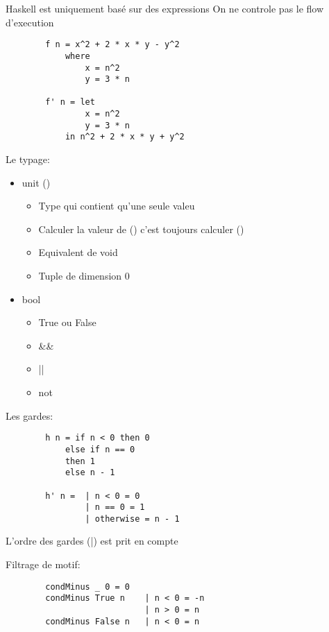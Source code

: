 \documentclass{article}
\begin{document}
    Haskell est uniquement basé sur des expressions
    On ne controle pas le flow d'execution

    \begin{lstlisting}
        f n = x^2 + 2 * x * y - y^2
            where
                x = n^2
                y = 3 * n

        f' n = let
                x = n^2
                y = 3 * n
            in n^2 + 2 * x * y + y^2
    \end{lstlisting}

    Le typage:
        \begin{itemize}
            \item unit ()
                \begin{itemize}
                    \item Type qui contient qu'une seule valeu
                    \item Calculer la valeur de () c'est toujours calculer ()
                    \item Equivalent de void
                    \item Tuple de dimension 0
                \end{itemize}
            \item bool
                \begin{itemize}
                    \item True ou False
                    \item &&
                    \item ||
                    \item not
                \end{itemize}

        \end{itemize}

    Les gardes:
    \begin{lstlisting}
        h n = if n < 0 then 0
            else if n == 0
            then 1
            else n - 1

        h' n =  | n < 0 = 0
                | n == 0 = 1
                | otherwise = n - 1
    \end{lstlisting}

    L'ordre des gardes (|) est prit en compte

    Filtrage de motif:
    \begin{lstlisting}
        condMinus _ 0 = 0
        condMinus True n    | n < 0 = -n
                            | n > 0 = n
        condMinus False n   | n < 0 = n
    \end{lstlisting}
\end{document}
